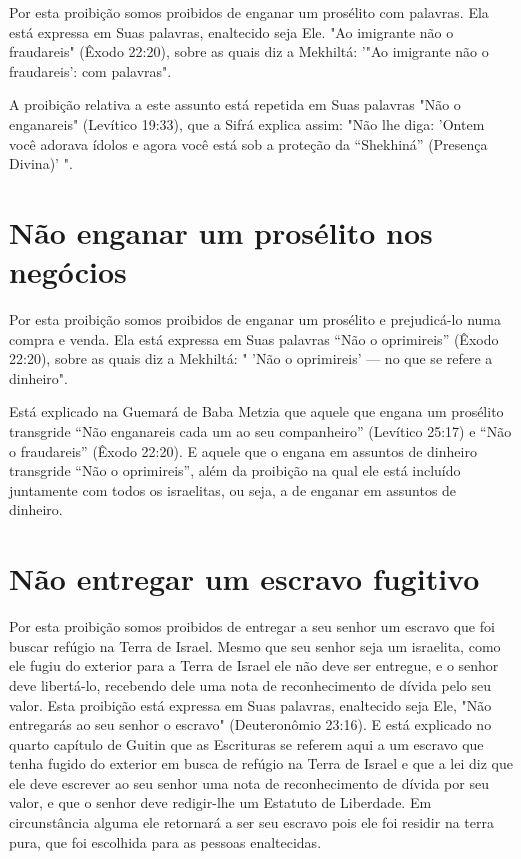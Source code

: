 Por esta proibição somos proibidos de enganar um prosélito com palavras.
Ela está expressa em Suas palavras, enaltecido seja Ele. "Ao imigrante
não o fraudareis" (Êxodo 22:20), sobre as quais diz a Mekhiltá: '"Ao
imigrante não o fraudareis': com palavras".

A proibição relativa a este assunto está repetida em Suas palavras "Não
o enganareis" (Levítico 19:33), que a Sifrá explica assim: "Não lhe
diga: 'On­tem você adorava ídolos e agora você está sob a proteção da
``Shekhiná'' (Pre­sença Divina)' ".

\section{Não enganar um prosélito nos negócios}

Por esta proibição somos proibidos de enganar um prosélito e
prejudicá-lo numa compra e venda. Ela está expressa em Suas palavras
``Não o oprimireis'' (Êxodo 22:20), sobre as quais diz a Mekhiltá: 
" 'Não o
oprimireis' --- no que se refere a dinheiro".

Está explicado na Guemará de Baba Metzia que aquele que engana um
prosélito transgride ``Não enganareis cada um ao seu companheiro''
(Leví­tico 25:17) e ``Não o fraudareis'' (Êxodo 22:20). E aquele que o
engana em as­suntos de dinheiro transgride ``Não o oprimireis'', além da
proibição na qual ele está incluído juntamente com todos os israelitas,
ou seja, a de enganar em assuntos de dinheiro.

\section{Não entregar um escravo fugitivo}

Por esta proibição somos proibidos de entregar a seu senhor um es­cravo
que foi buscar refúgio na Terra de Israel. Mesmo que seu senhor seja um
israelita, como ele fugiu do exterior para a Terra de Israel ele não
deve ser en­tregue, e o senhor deve libertá-lo, recebendo dele uma nota
de reconhecimen­to de dívida pelo seu valor. Esta proibição está
expressa em Suas palavras, enal­tecido seja Ele, "Não entregarás ao seu
senhor o escravo" (Deuteronômio 23:16). E está explicado no quarto
capítulo de Guitin que as Escrituras se referem aqui a um escravo que
tenha fugido do exterior em busca de refúgio na Terra de Israel e que a
lei diz que ele deve escrever ao seu senhor uma nota de reconhe­cimento
de dívida por seu valor, e que o senhor deve redigir-lhe um Estatuto de
Liberdade. Em circunstância alguma ele retornará a ser seu escravo pois
ele foi residir na terra pura, que foi escolhida para as pessoas
enaltecidas.

